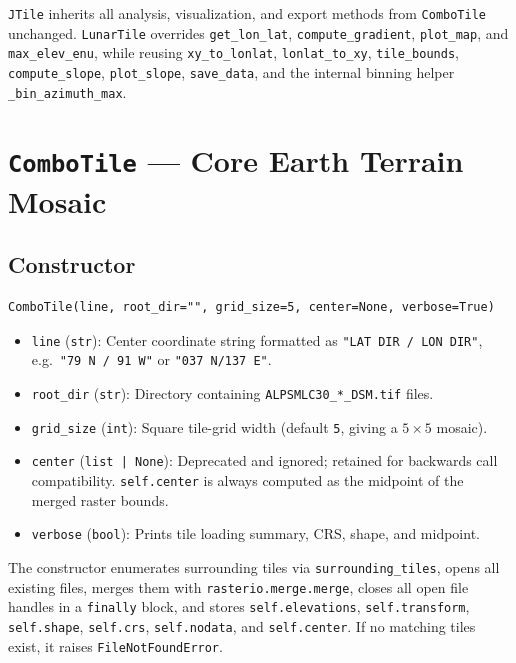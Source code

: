 \documentclass[11pt,letterpaper]{article}
\begin{document}
\texttt{JTile} inherits all analysis, visualization, and export methods from \texttt{ComboTile} unchanged. \texttt{LunarTile} overrides \texttt{get\_lon\_lat}, \texttt{compute\_gradient}, \texttt{plot\_map}, and \texttt{max\_elev\_enu}, while reusing \texttt{xy\_to\_lonlat}, \texttt{lonlat\_to\_xy}, \texttt{tile\_bounds}, \texttt{compute\_slope}, \texttt{plot\_slope}, \texttt{save\_data}, and the internal binning helper \texttt{\_bin\_azimuth\_max}.

\section{\texttt{ComboTile} --- Core Earth Terrain Mosaic}

\subsection{Constructor}
\begin{lstlisting}
ComboTile(line, root_dir="", grid_size=5, center=None, verbose=True)
\end{lstlisting}
\begin{itemize}
  \item \texttt{line} (\texttt{str}): Center coordinate string formatted as \texttt{"LAT DIR / LON DIR"}, e.g.\ \texttt{"79 N / 91 W"} or \texttt{"037 N/137 E"}.
  \item \texttt{root\_dir} (\texttt{str}): Directory containing \texttt{ALPSMLC30\_*\_DSM.tif} files.
  \item \texttt{grid\_size} (\texttt{int}): Square tile-grid width (default \texttt{5}, giving a $5\times 5$ mosaic).
  \item \texttt{center} (\texttt{list | None}): Deprecated and ignored; retained for backwards call compatibility. \texttt{self.center} is always computed as the midpoint of the merged raster bounds.
  \item \texttt{verbose} (\texttt{bool}): Prints tile loading summary, CRS, shape, and midpoint.
\end{itemize}
The constructor enumerates surrounding tiles via \texttt{surrounding\_tiles}, opens all existing files, merges them with \texttt{rasterio.merge.merge}, closes all open file handles in a \texttt{finally} block, and stores \texttt{self.elevations}, \texttt{self.transform}, \texttt{self.shape}, \texttt{self.crs}, \texttt{self.nodata}, and \texttt{self.center}. If no matching tiles exist, it raises \texttt{FileNotFoundError}.
\end{document}
